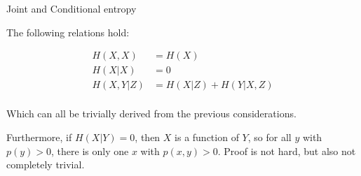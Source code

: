\documentclass[11pt,compress,t,notes=noshow, xcolor=table]{beamer}
\begin{document}

\begin{vbframe} {Joint and Conditional entropy}

The following relations hold:

\begin{equation*}
\begin{aligned}
H(X, X)       &= H(X)  \\
H(X | X)      &= 0  \\
H(X, Y | Z)   &=H(X | Z)+H(Y | X, Z)\\
\end{aligned}
\end{equation*}

Which can all be trivially derived from the previous considerations.

\lz

Furthermore, if $H(X|Y) = 0$, then $X$ is a function of $Y$, so for all $y$ with $p(y)>0$, there is only one $x$ with $p(x,y)>0$. 
Proof is not hard, but also not completely trivial.
\end{vbframe}
\end{document}
